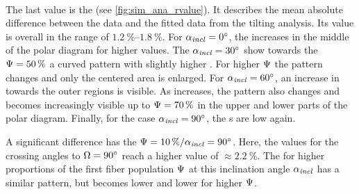 \paragraph{\rvalue}
The last value is the \rvalue{} (see \cref{fig:sim_ana_rvalue}).
It describes the mean absolute difference between the data and the fitted data from the tilting analysis.
Its value is overall in the range of $\SIrange{1.2}{1.8}{\percent}$.
For $\textnormal{$\alpha_{\mathit{incl}}$} = \SI{0}{\degree}$, the \rvalue{} increases in the middle of the polar diagram for higher \modelPsi{} values.
The $\textnormal{$\alpha_{\mathit{incl}}$} = \SI{30}{\degree}$ show towards the $\textnormal{$\Psi$} = \SI{50}{\percent}$ a curved pattern with slightly higher \rvalue{}.
For higher $\textnormal{$\Psi$}$ the pattern changes and only the centered area is enlarged.
For $\textnormal{$\alpha_{\mathit{incl}}$} = \SI{60}{\degree}$, an increase in \rvalue{} towards the outer regions is visible.
As \modelInc{} increases, the pattern also changes and becomes increasingly visible up to $\textnormal{$\Psi$}=\SI{70}{\percent}$ in the upper and lower parts of the polar diagram.
Finally, for the case $\textnormal{$\alpha_{\mathit{incl}}$} = \SI{90}{\degree}$, the \rvalue s are low again.
\par
%
A significant difference has the $\textnormal{$\Psi$} = \SI{10}{\percent} / \textnormal{$\alpha_{\mathit{incl}}$} = \SI{90}{\degree}$.
Here, the values for the crossing angles to $\textnormal{$\Omega$} = \SI{90}{\degree}$ reach a higher value of $\approx \SI{2.2}{\percent}$.
The \rvalue{} for higher proportions of the first fiber population $\textnormal{$\Psi$}$ at this inclination angle $\textnormal{$\alpha_{\mathit{incl}}$}$ has a similar pattern, but becomes lower and lower for higher $\textnormal{$\Psi$}$.
%
%
%
%
